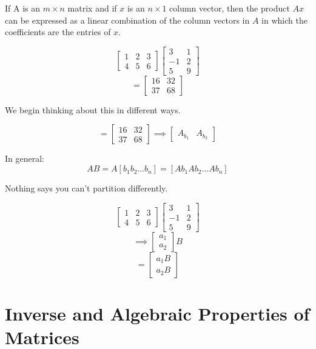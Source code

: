 \begin{theorem}[1.3.1]
If A is an $m\times n$ matrix and if $x$ is an $n\times 1$ column vector, then
the product $Ax$ can be expressed as a linear combination of the
column vectors in $A$ in which the coefficients are the entries
of $x$.
\end{theorem}

\[\begin{bmatrix} 1& 2 & 3 \\ 4 & 5 & 6 \end{bmatrix}  \begin{bmatrix} 3 & 1 \\ -1 & 2 \\ 5 & 9 \end{bmatrix} \]
\[= \begin{bmatrix} 16 & 32 \\ 37 & 68 \end{bmatrix} \]

We begin thinking about this in different ways.

\[= \begin{bmatrix} 16 & 32 \\ 37 & 68 \end{bmatrix} \implies \begin{bmatrix} A_{b_1} & A_{b_2} \end{bmatrix}  \]

In general: \[AB = A[b_1 b_2 \ldots b_{n}] = [Ab_1 Ab_2 \ldots Ab_{n}]\]

Nothing says you can't partition differently.

\[\begin{bmatrix} 1& 2 & 3 \\ 4 & 5 & 6 \end{bmatrix}  \begin{bmatrix} 3 & 1 \\ -1 & 2 \\ 5 & 9 \end{bmatrix} \]
\[\implies \begin{bmatrix} a_1 \\ a_2 \end{bmatrix} B \]
\[= \begin{bmatrix} a_1B \\ a_2B \end{bmatrix} \]

\section{Inverse and Algebraic Properties of Matrices}%
\label{sec:inverse_and_algebraic_properties_of_matrices}



